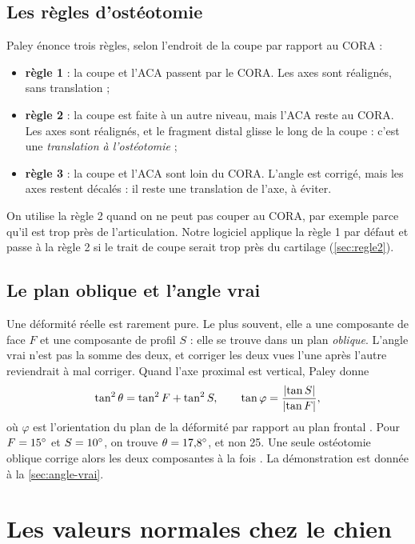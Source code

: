 \subsection{Les règles d'ostéotomie}

Paley énonce trois règles, selon l'endroit de la coupe par rapport au CORA :
\begin{itemize}
  \item \textbf{règle 1} : la coupe et l'ACA passent par le CORA. Les axes sont réalignés, sans translation ;
  \item \textbf{règle 2} : la coupe est faite à un autre niveau, mais l'ACA reste au CORA. Les axes sont réalignés,
  et le fragment distal glisse le long de la coupe : c'est une \emph{translation à l'ostéotomie} ;
  \item \textbf{règle 3} : la coupe et l'ACA sont loin du CORA. L'angle est corrigé, mais les axes restent décalés :
  il reste une translation de l'axe, à éviter.
\end{itemize}
On utilise la règle 2 quand on ne peut pas couper au CORA, par exemple parce qu'il est trop près de l'articulation.
Notre logiciel applique la règle 1 par défaut et passe à la règle 2 si le trait de coupe serait trop près du
cartilage (\cref{sec:regle2}).

\subsection{Le plan oblique et l'angle vrai}
\label{sec:oblique}

Une déformité réelle est rarement pure. Le plus souvent, elle a une composante de face $F$ et une composante de profil
$S$ : elle se trouve dans un plan \emph{oblique}. L'angle vrai n'est pas la somme des deux, et corriger les deux vues
l'une après l'autre reviendrait à mal corriger. Quand l'axe proximal est vertical, Paley donne
\begin{equation}
  \tan^2\theta = \tan^2 F + \tan^2 S,
  \qquad
  \tan\varphi = \frac{\lvert\tan S\rvert}{\lvert\tan F\rvert},
  \label{eq:oblique}
\end{equation}
où $\varphi$ est l'orientation du plan de la déformité par rapport au plan frontal \cite{paley2002,qatu2024}. Pour
$F = 15^\circ$ et $S = 10^\circ$, on trouve $\theta = 17{,}8^\circ$, et non 25\degre. Une seule ostéotomie oblique
corrige alors les deux composantes à la fois \cite{kim2017}. La démonstration est donnée à la \cref{sec:angle-vrai}.

\section{Les valeurs normales chez le chien}
\label{sec:normales}

